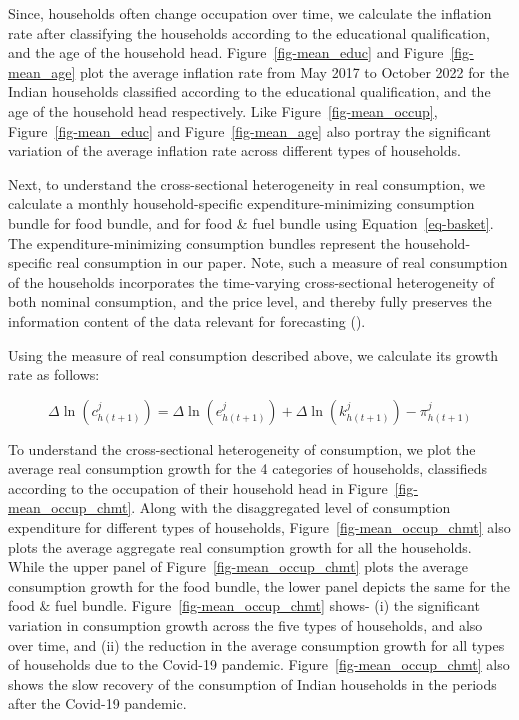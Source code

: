 \documentclass[
  abstract]{scrartcl}
\begin{document}
Since, households often change occupation over time, we calculate the
inflation rate after classifying the households according to the
educational qualification, and the age of the household head.
{Figure~\ref{fig-mean_educ} and Figure~\ref{fig-mean_age}} plot the
average inflation rate from May 2017 to October 2022 for the Indian
households classified according to the educational qualification, and
the age of the household head respectively. Like
Figure~\ref{fig-mean_occup}, {Figure~\ref{fig-mean_educ} and
Figure~\ref{fig-mean_age}} also portray the significant variation of the
average inflation rate across different types of households.

Next, to understand the cross-sectional heterogeneity in real
consumption, we calculate a monthly household-specific
expenditure-minimizing consumption bundle for food bundle, and for food
\& fuel bundle using Equation~\ref{eq-basket}. The
expenditure-minimizing consumption bundles represent the
household-specific real consumption in our paper. Note, such a measure
of real consumption of the households incorporates the time-varying
cross-sectional heterogeneity of both nominal consumption, and the price
level, and thereby fully preserves the information content of the data
relevant for forecasting ().

Using the measure of real consumption described above, we calculate its
growth rate as follows:

\[
\Delta \ln \left(c_{h(t+1)}^j\right)=\Delta \ln \left(e_{h(t+1)}^j\right)+\Delta \ln \left(k_{h(t+1)}^j\right)-\pi_{h(t+1)}^j
\]

To understand the cross-sectional heterogeneity of consumption, we plot
the average real consumption growth for the 4 categories of households,
classifieds according to the occupation of their household head in
Figure~\ref{fig-mean_occup_chmt}. Along with the disaggregated level of
consumption expenditure for different types of households,
Figure~\ref{fig-mean_occup_chmt} also plots the average aggregate real
consumption growth for all the households. While the upper panel of
Figure~\ref{fig-mean_occup_chmt} plots the average consumption growth
for the food bundle, the lower panel depicts the same for the food \&
fuel bundle. Figure~\ref{fig-mean_occup_chmt} shows- (i) the significant
variation in consumption growth across the five types of households, and
also over time, and (ii) the reduction in the average consumption growth
for all types of households due to the Covid-19 pandemic.
Figure~\ref{fig-mean_occup_chmt} also shows the slow recovery of the
consumption of Indian households in the periods after the Covid-19
pandemic.
\end{document}
